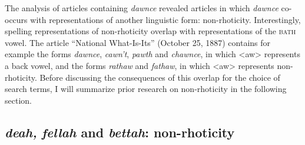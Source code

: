 The analysis of articles containing \emph{dawnce} revealed articles in which \textit{dawnce} co-occurs with representations of another linguistic form: non-rhoticity. Interestingly, spelling representations of non-rhoticity overlap with representations of the \textsc{bath} vowel. The article “National What-Is-Its” (October 25, 1887) contains for example the forms \emph{dawnce}, \emph{cawn’t}, \emph{pawth} and \emph{chawnce}, in which <aw> represents a back vowel, and the forms \emph{rathaw}{} and \emph{fathaw}, in which <aw> represents non-rhoticity. Before discussing the consequences of this overlap for the choice of search terms, I will summarize prior research on non-rhoticity in the following section.

\subsection{\emph{deah,}  \emph{fellah} {and}\emph{ bettah}: non-rhoticity}
\label{bkm:Ref530736302}\hypertarget{Toc63021226}{}
